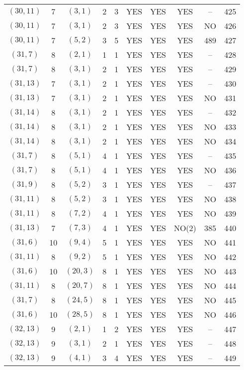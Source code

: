 \begin{longtable}{|c|c|c|c|c|c|c|c|c|c|}
$(30, 11)$ & 7 & $(3, 1)$ & 2 & 3 & YES & YES & YES & -- & 425\\
$(30, 11)$ & 7 & $(3, 1)$ & 2 & 3 & YES & YES & YES & NO & 426\\
$(30, 11)$ & 7 & $(5, 2)$ & 3 & 5 & YES & YES & YES & 489 & 427\\
$(31, 7)$ & 8 & $(2, 1)$ & 1 & 1 & YES & YES & YES & -- & 428\\
$(31, 7)$ & 8 & $(3, 1)$ & 2 & 1 & YES & YES & YES & -- & 429\\
$(31, 13)$ & 7 & $(3, 1)$ & 2 & 1 & YES & YES & YES & -- & 430\\
$(31, 13)$ & 7 & $(3, 1)$ & 2 & 1 & YES & YES & YES & NO & 431\\
$(31, 14)$ & 8 & $(3, 1)$ & 2 & 1 & YES & YES & YES & -- & 432\\
$(31, 14)$ & 8 & $(3, 1)$ & 2 & 1 & YES & YES & YES & NO & 433\\
$(31, 14)$ & 8 & $(3, 1)$ & 2 & 1 & YES & YES & YES & NO & 434\\
$(31, 7)$ & 8 & $(5, 1)$ & 4 & 1 & YES & YES & YES & -- & 435\\
$(31, 7)$ & 8 & $(5, 1)$ & 4 & 1 & YES & YES & YES & NO & 436\\
$(31, 9)$ & 8 & $(5, 2)$ & 3 & 1 & YES & YES & YES & -- & 437\\
$(31, 11)$ & 8 & $(5, 2)$ & 3 & 1 & YES & YES & YES & NO & 438\\
$(31, 11)$ & 8 & $(7, 2)$ & 4 & 1 & YES & YES & YES & NO & 439\\
$(31, 13)$ & 7 & $(7, 3)$ & 4 & 1 & YES & YES & NO(2) & 385 & 440\\
$(31, 6)$ & 10 & $(9, 4)$ & 5 & 1 & YES & YES & YES & NO & 441\\
$(31, 11)$ & 8 & $(9, 2)$ & 5 & 1 & YES & YES & YES & NO & 442\\
$(31, 6)$ & 10 & $(20, 3)$ & 8 & 1 & YES & YES & YES & NO & 443\\
$(31, 11)$ & 8 & $(20, 7)$ & 8 & 1 & YES & YES & YES & NO & 444\\
$(31, 7)$ & 8 & $(24, 5)$ & 8 & 1 & YES & YES & YES & NO & 445\\
$(31, 6)$ & 10 & $(28, 5)$ & 8 & 1 & YES & YES & YES & NO & 446\\
$(32, 13)$ & 9 & $(2, 1)$ & 1 & 2 & YES & YES & YES & -- & 447\\
$(32, 13)$ & 9 & $(3, 1)$ & 2 & 1 & YES & YES & YES & -- & 448\\
$(32, 13)$ & 9 & $(4, 1)$ & 3 & 4 & YES & YES & YES & -- & 449\\

\end{longtable}

